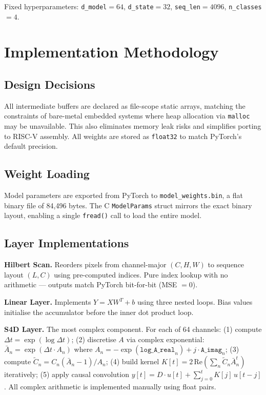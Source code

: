 \documentclass[conference]{IEEEtran}
\begin{document}
Fixed hyperparameters: \texttt{d\_model}$=64$, \texttt{d\_state}$=32$,
\texttt{seq\_len}$=4096$, \texttt{n\_classes}$=4$.

\section{Implementation Methodology}

\subsection{Design Decisions}
All intermediate buffers are declared as file-scope static arrays, matching
the constraints of bare-metal embedded systems where heap allocation via
\texttt{malloc} may be unavailable. This also eliminates memory leak risks
and simplifies porting to RISC-V assembly. All weights are stored as
\texttt{float32} to match PyTorch's default precision.

\subsection{Weight Loading}
Model parameters are exported from PyTorch to \texttt{model\_weights.bin},
a flat binary file of 84,496 bytes. The C \texttt{ModelParams} struct mirrors
the exact binary layout, enabling a single \texttt{fread()} call to load the
entire model.

\subsection{Layer Implementations}

\textbf{Hilbert Scan.} Reorders pixels from channel-major $(C,H,W)$ to
sequence layout $(L,C)$ using pre-computed indices. Pure index lookup with
no arithmetic --- outputs match PyTorch bit-for-bit (MSE $= 0$).

\textbf{Linear Layer.} Implements $Y = XW^T + b$ using three nested loops.
Bias values initialise the accumulator before the inner dot product loop.

\textbf{S4D Layer.} The most complex component. For each of 64 channels:
(1) compute $\Delta t = \exp(\log\Delta t)$;
(2) discretise $A$ via complex exponential:
$\bar{A}_n = \exp(\Delta t \cdot A_n)$ where $A_n = -\exp(\texttt{log\_A\_real}_n) + j \cdot \texttt{A\_imag}_n$;
(3) compute $\tilde{C}_n = C_n(\bar{A}_n - 1)/A_n$;
(4) build kernel $K[t] = 2\,\text{Re}\!\left(\sum_n \tilde{C}_n \bar{A}_n^t\right)$ iteratively;
(5) apply causal convolution $y[t] = D \cdot u[t] + \sum_{j=0}^{t} K[j]\,u[t-j]$.
All complex arithmetic is implemented manually using float pairs.
\end{document}
